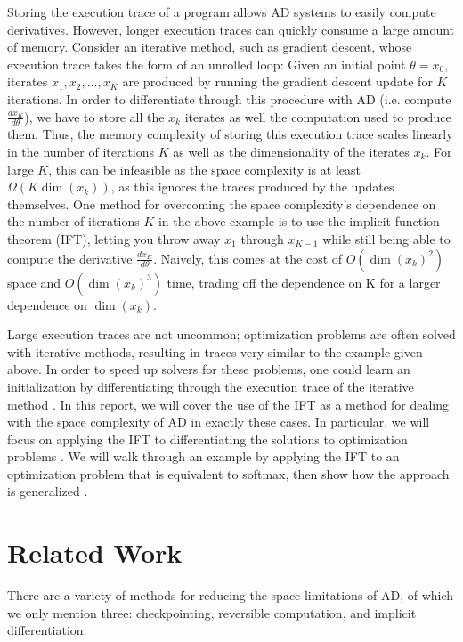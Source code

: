 \documentclass[11pt]{article}
\begin{document}
Storing the execution trace of a program allows AD systems to easily compute derivatives.
However, longer execution traces can quickly consume a large amount of memory.
Consider an iterative method, such as gradient descent,
whose execution trace takes the form of an unrolled loop:
Given an initial point $\theta = x_0$,
iterates $x_1, x_2, ..., x_{K}$ are produced by running the gradient descent
update for $K$ iterations.
In order to differentiate through this procedure with AD
(i.e. compute $\frac{dx_K}{d\theta}$),
we have to store all the $x_k$ iterates
as well the computation used to produce them.
Thus, the memory complexity of storing this execution trace scales linearly in the
number of iterations $K$ as well as the dimensionality of the iterates $x_k$.
For large $K$, this can be infeasible as the space complexity is at least $\Omega(K\dim(x_k))$,
as this ignores the traces produced by the updates themselves.
One method for overcoming the space complexity's dependence on the number of iterations $K$ in
the above example is to use the implicit function theorem (IFT),
letting you throw away $x_1$ through $x_{K-1}$
while still being able to compute the derivative $\frac{dx_{K}}{d\theta}$.
Naively, this comes at the cost of $O(\dim(x_k)^2)$ space and $O(\dim(x_k)^3)$ time,
trading off the dependence on K for a larger dependence on $\dim(x_k)$.

Large execution traces are not uncommon;
optimization problems are often solved with iterative methods,
resulting in traces very similar to the example given above.
In order to speed up solvers for these problems,
one could learn an initialization by differentiating through the
execution trace of the iterative method \citep{finn2017maml,kim2018savi,neuralinit}.
In this report, we will cover the use of the IFT
as a method for dealing with the space complexity of AD in exactly these cases.
In particular,
we will focus on applying the IFT to differentiating the solutions to optimization problems
\citep{optnet,agrawal2019diffcvx}.
We will walk through an example by applying the IFT to an optimization problem
that is equivalent to softmax,
then show how the approach is generalized \citep{optnet}.

\section{Related Work}
There are a variety of methods for reducing the space limitations of AD,
of which we only mention three: checkpointing, reversible computation, and implicit differentiation.
\end{document}
